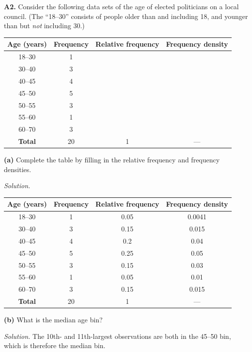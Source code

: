 \documentclass[
  a4paper,
]{book}
\theoremstyle{definition}
\theoremstyle{definition}
\theoremstyle{definition}
\theoremstyle{definition}
\theoremstyle{remark}
\begin{document}
\textbf{A2.} Consider the following data sets of the age of elected politicians on a local council. (The ``18--30'' consists of people older than and including 18, and younger than but \emph{not} including 30.)

\begin{longtable}[]{@{}cccc@{}}
\toprule
Age (years) & Frequency & Relative frequency & Frequency density \\
\midrule
\endhead
18--30 & 1 & & \\
30--40 & 3 & & \\
40--45 & 4 & & \\
45--50 & 5 & & \\
50--55 & 3 & & \\
55--60 & 1 & & \\
60--70 & 3 & & \\
\textbf{Total} & 20 & 1 & --- \\
\bottomrule
\end{longtable}

\textbf{(a)} Complete the table by filling in the relative frequency and frequency densities.

\begin{myanswers}

\emph{Solution.}

\begin{longtable}[]{@{}cccc@{}}
\toprule
Age (years) & Frequency & Relative frequency & Frequency density \\
\midrule
\endhead
18--30 & 1 & 0.05 & 0.0041 \\
30--40 & 3 & 0.15 & 0.015 \\
40--45 & 4 & 0.2 & 0.04 \\
45--50 & 5 & 0.25 & 0.05 \\
50--55 & 3 & 0.15 & 0.03 \\
55--60 & 1 & 0.05 & 0.01 \\
60--70 & 3 & 0.15 & 0.015 \\
\textbf{Total} & 20 & 1 & --- \\
\bottomrule
\end{longtable}

\end{myanswers}

\textbf{(b)} What is the median age bin?

\begin{myanswers}
\emph{Solution.} The 10th- and 11th-largest observations are both in the 45--50 bin, which is therefore the median bin.

\end{myanswers}
\end{document}
